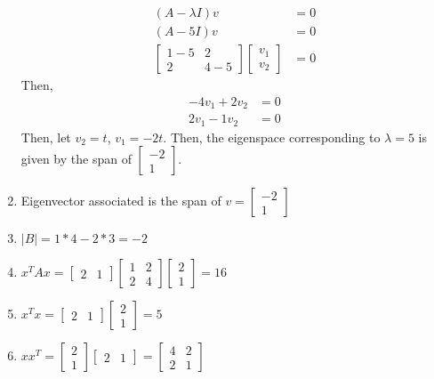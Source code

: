 \documentclass[11pt]{scrartcl}
\begin{document}
\begin{enumerate}
\begin{align*}
(A - \lambda I) v &= 0 \\
(A - 5I) v &= 0 \\
\begin{bmatrix} 1 - 5 & 2 \\ 2 & 4 - 5 \end{bmatrix} \begin{bmatrix} v_1 \\ v_2 \end{bmatrix} &= 0
\end{align*}
Then,
\begin{align*}
-4v_1 + 2v_2 &= 0 \\
2v_1 -1v_2 &= 0
\end{align*}
Then, let $v_2 = t$, $v_1 = -2t$. Then, the eigenspace corresponding to $\lambda = 5$ is given by the span of $\begin{bmatrix} -2 \\ 1 \end{bmatrix}$.
\item Eigenvector associated is the span of $v = \begin{bmatrix} -2 \\ 1 \end{bmatrix}$

\item $|B| = 1*4 - 2*3 = -2$

\item $x^T Ax = \begin{bmatrix} 2 & 1 \end{bmatrix} \begin{bmatrix} 1 & 2 \\ 2 & 4 \end{bmatrix} \begin{bmatrix} 2 \\ 1 \end{bmatrix} = 16$

\item $x^T x = \begin{bmatrix} 2 & 1 \end{bmatrix} \begin{bmatrix} 2 \\ 1 \end{bmatrix} = 5$

\item $x x^T = \begin{bmatrix} 2 \\ 1 \end{bmatrix} \begin{bmatrix} 2 & 1 \end{bmatrix} = \begin{bmatrix} 4 & 2 \\ 2 & 1 \end{bmatrix}$


\end{enumerate}
\end{document}
